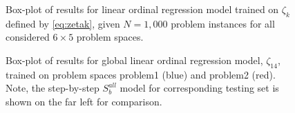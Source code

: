\begin{figure}\centering
\end{figure}

\begin{figure}\centering
\ContinuedFloat 
\end{figure}

\begin{figure} \centering
\ContinuedFloat 
\end{figure}

\begin{figure}\centering
\ContinuedFloat 
\end{figure}

\begin{figure}\centering
\ContinuedFloat 
\caption{Box-plot of results for linear ordinal regression model trained on $\zeta_k$ defined by \cref{eq:zetak}, given $N=1,000$ problem instances for all considered $6\times5$ problem spaces.}\label{fig:stepbystep:boxplot}
\end{figure}



\begin{figure}\centering
\caption{Box-plot of results for global linear ordinal regression model, $\zeta_{14}$, trained on problem spaces problem{1} (blue) and problem{2} (red). Note, the step-by-step $S_b^{all}$ model for corresponding testing set is shown on the far left for comparison.}
\label{fig:global}
\end{figure}

